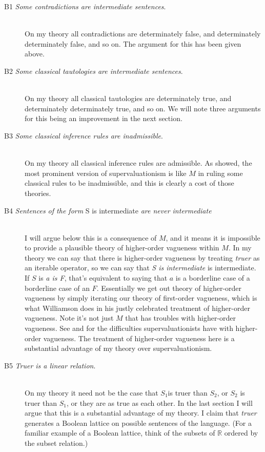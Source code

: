 \begin{description}
\item[B1 \textit{Some contradictions are intermediate sentences}.]  \hspace*{\fill} \\
On my theory all contradictions are determinately false, and determinately determinately false, and so on. The argument for this has been given above.
\item[B2 \textit{Some classical tautologies are intermediate sentences}.]  \hspace*{\fill} \\
On my theory all classical tautologies are determinately true, and determinately determinately true, and so on. We will note three arguments for this being an improvement in the next section.
\item[B3 \textit{Some classical inference rules are inadmissible}.] \hspace*{\fill} \\
On my theory all classical inference rules are admissible. As \citet{Williamson1994-WILV} showed, the most prominent version of supervaluationism is like \(M\) in ruling some classical rules to be inadmissible, and this is clearly a cost of those theories.
\item[B4 \textit{Sentences of the form }S is intermediate\textit{ are never intermediate}] \hspace*{\fill} \\
I will argue below this is a consequence of \(M\), and it means it is impossible to provide a plausible theory of higher-order vagueness within \(M\). In my theory we can say that there is higher-order vagueness by treating \textit{truer} as an iterable operator, so we can say that \textit{S is intermediate} is intermediate. If \(S\) is \textit{a is F}, that's equivalent to saying that \(a\) is a borderline case of a borderline case of an \(F\). Essentially we get out theory of higher-order vagueness by simply iterating our theory of first-order vagueness, which is what Williamson does in his justly celebrated treatment of higher-order vagueness. Note it's not just \(M\) that has troubles with higher-order vagueness. See \citet{Williamson1994-WILV} and \citet{Weatherson2003-Keefe} for the difficulties supervaluationists have with higher-order vagueness. The treatment of higher-order vagueness here is a substantial advantage of my theory over supervaluationism.
\item[B5 \textit{Truer is a linear relation}.] \hspace*{\fill} \\
On my theory it need not be the case that \(S_1\)is truer than \(S_2\), or \(S_2\) is truer than \(S_1\), or they are as true as each other. In the last section I will argue that this is a substantial advantage of my theory. I claim that \textit{truer} generates a Boolean lattice on possible sentences of the language. (For a familiar example of a Boolean lattice, think of the subsets of \(\mathbb{R}\) ordered by the subset relation.)
\end{description}

